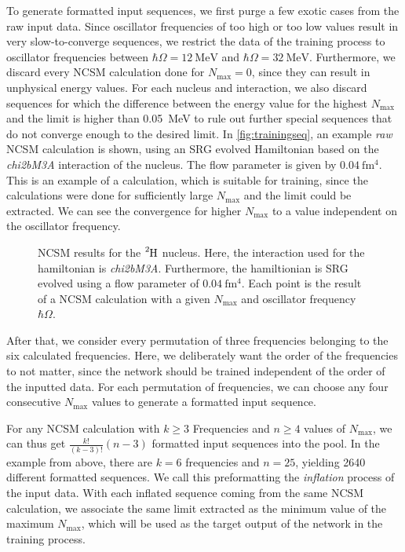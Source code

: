 To generate formatted input sequences, we first purge a few exotic cases from the raw input data. Since oscillator frequencies of too high or too low values result in very slow-to-converge sequences, we restrict the data of the training process to oscillator frequencies between $\hbar\Omega=\SI{12}{\mega\electronvolt}$ and $\hbar\Omega=\SI{32}{\mega\electronvolt}$. Furthermore, we discard every NCSM calculation done for $N_\mathrm{max} = 0$, since they can result in unphysical energy values. For each nucleus and interaction, we also discard sequences for which the difference between the energy value for the highest $N_\mathrm{max}$ and the limit is higher than \SI{0.05}{\mega\electronvolt} to rule out further special sequences that do not converge enough to the desired limit.
In \autoref{fig:trainingseq}, an example \textit{raw} NCSM calculation is shown, using an SRG evolved Hamiltonian based on the \textit{chi2bM3A} interaction of the  nucleus. The flow parameter is given by $\SI{0.04}{\femto\metre^4}$. This is an example of a calculation, which is suitable for training, since the calculations were done for sufficiently large $N_\mathrm{max}$ and the limit could be extracted. We can see the convergence for higher $N_\mathrm{max}$ to a value independent on the oscillator frequency.

\begin{figure}[H]
  \centering
  
  \caption{NCSM results for the $\n{2}{H}$ nucleus. Here, the interaction used for the hamiltonian is \textit{chi2bM3A}. Furthermore, the hamiltionian is SRG evolved using a flow parameter of $\SI{0.04}{\femto\metre^4}$. Each point is the result of a NCSM calculation with a given $N_\mathrm{max}$ and oscillator frequency $\hbar \Omega$.}
  \label{fig:trainingseq}
\end{figure}

After that, we consider every permutation of three frequencies belonging to the six calculated frequencies. Here, we deliberately want the order of the frequencies to not matter, since the network should be trained independent of the order of the inputted data. For each permutation of frequencies, we can choose any four consecutive $N_\mathrm{max}$ values to generate a formatted input sequence.

For any NCSM calculation with $k \geq 3$ Frequencies and $n \geq 4 $ values of $N_\mathrm{max}$, we can thus get $\frac{k!}{(k-3)!} (n-3)$ formatted input sequences into the pool. In the example from above, there are $k=6$ frequencies and $n = 25$, yielding 2640 different formatted sequences. We call this preformatting the \textit{inflation} process of the input data. With each inflated sequence coming from the same NCSM calculation, we associate the same limit extracted as the minimum value of the maximum $N_\mathrm{max}$, which will be used as the target output of the network in the training process.

